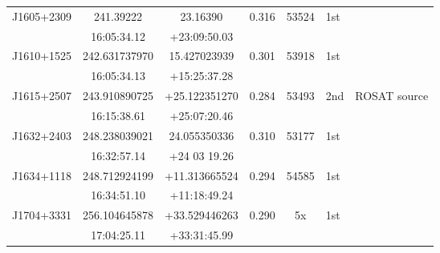 \begin{table*}
\begin{tabular} {l  cc  cc l l}
\multirow{ 2}{*}{J1605+2309}   &  241.39222           &    23.16390              &  \multirow{ 2}{*}{0.316}   & \multirow{ 2}{*}{53524}   &   \multirow{ 2}{*}{1st}     &      \\
                                                 &  16:05:34.12         &  +23:09:50.03         &                                         &                                        &             &      \\ 
\multirow{ 2}{*}{J1610+1525}   &  242.631737970   &   15.427023939       & \multirow{ 2}{*}{0.301}     &\multirow{ 2}{*}{53918}    &   \multirow{ 2}{*}{1st}     &      \\
                                                 &  16:05:34.13         &  +15:25:37.28          &                                        &                                        &              &     \\ 
\multirow{ 2}{*}{J1615+2507}   &  243.910890725   &  +25.122351270     &\multirow{ 2}{*}{0.284}     & \multirow{ 2}{*}{53493}    &  \multirow{ 2}{*}{2nd}      &  ROSAT source   \\
                                                 &  16:15:38.61         & +25:07:20.46          &                                        &                                         &              &        \\  
\multirow{ 2}{*}{J1632+2403}   &  248.238039021   &  24.055350336        &\multirow{ 2}{*}{0.310}    &\multirow{ 2}{*}{53177}     &   \multirow{ 2}{*}{1st}       &       \\
                                                 &  16:32:57.14         &  +24 03 19.26         &                                       &                                          &              &        \\   
\multirow{ 2}{*}{J1634+1118}   &  248.712924199   &  +11.313665524      &\multirow{ 2}{*}{0.294}   & \multirow{ 2}{*}{54585}     &  \multirow{ 2}{*}{1st}      &          \\
                                                 & 16:34:51.10          &  +11:18:49.24         &                                        &                                          &              &           \\  
\multirow{ 2}{*}{J1704+3331}   & 256.104645878    &  +33.529446263     &\multirow{ 2}{*}{0.290}    & \multirow{ 2}{*}{5x}            &   \multirow{ 2}{*}{1st}    &            \\
                                                 & 17:04:25.11          &  +33:31:45.99        &                                       &                                            &             &           \\  

\end{tabular}
\end{table*}
